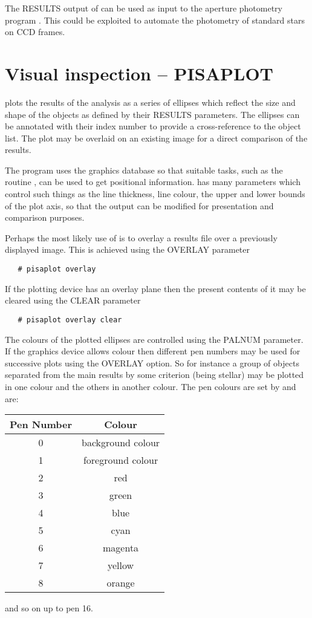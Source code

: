 The RESULTS output of  can be used as input to the
aperture photometry program . This could be
exploited to automate the photometry of standard stars on CCD frames.

\section{Visual inspection -- PISAPLOT}

 plots the results of the  analysis as a
series of ellipses which reflect the size and shape of the objects as
defined by their RESULTS parameters. The ellipses can be annotated
with their index number to provide a cross-reference to the object
list. The plot may be overlaid on an existing image for a direct
comparison of the results.

The program uses  the graphics database so that
suitable tasks, such as the  routine
, can be used to get positional
information.  has many parameters which control such things as
the line thickness, line colour, the upper and lower bounds of the
plot axis, so that the output can be modified for presentation and
comparison purposes.

Perhaps the most likely use of  is to overlay a results
file over a previously displayed image. This is achieved using the
OVERLAY parameter
\begin{verbatim}
   # pisaplot overlay
\end{verbatim}

If the plotting device has an overlay plane then the present contents of
it may be cleared using the CLEAR parameter
\begin{verbatim}
   # pisaplot overlay clear
\end{verbatim}

The colours of the plotted ellipses are controlled using the PALNUM
parameter. If the graphics device allows colour then different pen
numbers may be used for successive plots using the OVERLAY option. So for
instance a group of objects separated from the main results by some
criterion (being stellar) may be plotted in one colour and the others in
another colour. The pen colours are set by  and are:
\begin{center}
\begin{tabular}{|c|c|}
\hline
Pen Number & Colour \\
\hline
\hline
0 & background colour \\
1 & foreground colour \\
2 & red \\
3 & green \\
4 & blue \\
5 & cyan \\
6 & magenta \\
7 & yellow \\
8 & orange \\
\hline
\end{tabular}
\end{center}
and so on up to pen 16.

